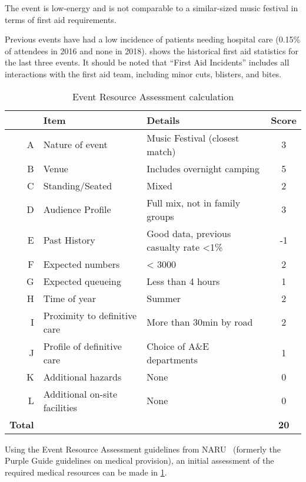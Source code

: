 The event is low-energy and is not comparable to a similar-sized music festival
in terms of first aid requirements.

Previous events have had a low incidence of patients needing hospital care (0.15\% of
attendees in 2016 and none in 2018).  shows the historical
first aid statistics for the last three events. It should be noted that ``First Aid
Incidents'' includes all interactions with the first aid team, including minor cuts,
blisters, and bites.

\begin{table}[h!]
    \caption{Event Resource Assessment calculation}
    \label{table:narucalc}
    \centering
    \begin{tabular}{| r l l c |}
        \hline
           & \textbf{Item} & \textbf{Details} & \textbf{Score} \\
        \hline
        A & Nature of event & Music Festival (closest match) & 3 \\
          B & Venue & Includes overnight camping & 5 \\
          C & Standing/Seated & Mixed & 2 \\
          D & Audience Profile & Full mix, not in family groups & 3 \\
          E & Past History & Good data, previous casualty rate <1\% & -1 \\
          F & Expected numbers & < 3000 & 2 \\
          G & Expected queueing & Less than 4 hours & 1 \\
          H & Time of year & Summer & 2 \\
          I & Proximity to definitive care & More than 30min by road & 2 \\
          J & Profile of definitive care & Choice of A\&E departments & 1 \\
          K & Additional hazards & None & 0 \\
          L & Additional on-site facilities & None & 0 \\
          \textbf{Total} & & & \textbf{20} \\
        \hline
    \end{tabular}
\end{table}

Using the Event Resource Assessment guidelines from NARU~\cite{naru} (formerly
the Purple Guide guidelines on medical provision), an initial assessment of the
required medical resources can be made in \cref{table:narucalc}.

